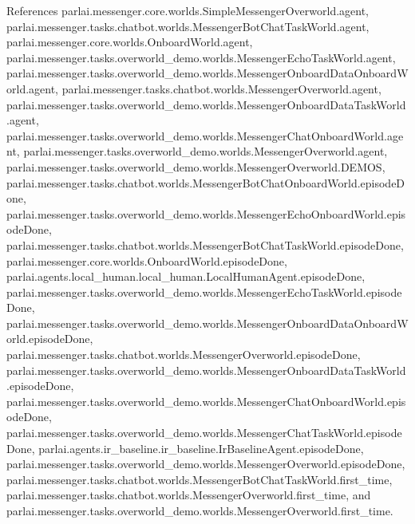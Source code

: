 References parlai.\+messenger.\+core.\+worlds.\+Simple\+Messenger\+Overworld.\+agent, parlai.\+messenger.\+tasks.\+chatbot.\+worlds.\+Messenger\+Bot\+Chat\+Task\+World.\+agent, parlai.\+messenger.\+core.\+worlds.\+Onboard\+World.\+agent, parlai.\+messenger.\+tasks.\+overworld\+\_\+demo.\+worlds.\+Messenger\+Echo\+Task\+World.\+agent, parlai.\+messenger.\+tasks.\+overworld\+\_\+demo.\+worlds.\+Messenger\+Onboard\+Data\+Onboard\+World.\+agent, parlai.\+messenger.\+tasks.\+chatbot.\+worlds.\+Messenger\+Overworld.\+agent, parlai.\+messenger.\+tasks.\+overworld\+\_\+demo.\+worlds.\+Messenger\+Onboard\+Data\+Task\+World.\+agent, parlai.\+messenger.\+tasks.\+overworld\+\_\+demo.\+worlds.\+Messenger\+Chat\+Onboard\+World.\+agent, parlai.\+messenger.\+tasks.\+overworld\+\_\+demo.\+worlds.\+Messenger\+Overworld.\+agent, parlai.\+messenger.\+tasks.\+overworld\+\_\+demo.\+worlds.\+Messenger\+Overworld.\+D\+E\+M\+OS, parlai.\+messenger.\+tasks.\+chatbot.\+worlds.\+Messenger\+Bot\+Chat\+Onboard\+World.\+episode\+Done, parlai.\+messenger.\+tasks.\+overworld\+\_\+demo.\+worlds.\+Messenger\+Echo\+Onboard\+World.\+episode\+Done, parlai.\+messenger.\+tasks.\+chatbot.\+worlds.\+Messenger\+Bot\+Chat\+Task\+World.\+episode\+Done, parlai.\+messenger.\+core.\+worlds.\+Onboard\+World.\+episode\+Done, parlai.\+agents.\+local\+\_\+human.\+local\+\_\+human.\+Local\+Human\+Agent.\+episode\+Done, parlai.\+messenger.\+tasks.\+overworld\+\_\+demo.\+worlds.\+Messenger\+Echo\+Task\+World.\+episode\+Done, parlai.\+messenger.\+tasks.\+overworld\+\_\+demo.\+worlds.\+Messenger\+Onboard\+Data\+Onboard\+World.\+episode\+Done, parlai.\+messenger.\+tasks.\+chatbot.\+worlds.\+Messenger\+Overworld.\+episode\+Done, parlai.\+messenger.\+tasks.\+overworld\+\_\+demo.\+worlds.\+Messenger\+Onboard\+Data\+Task\+World.\+episode\+Done, parlai.\+messenger.\+tasks.\+overworld\+\_\+demo.\+worlds.\+Messenger\+Chat\+Onboard\+World.\+episode\+Done, parlai.\+messenger.\+tasks.\+overworld\+\_\+demo.\+worlds.\+Messenger\+Chat\+Task\+World.\+episode\+Done, parlai.\+agents.\+ir\+\_\+baseline.\+ir\+\_\+baseline.\+Ir\+Baseline\+Agent.\+episode\+Done, parlai.\+messenger.\+tasks.\+overworld\+\_\+demo.\+worlds.\+Messenger\+Overworld.\+episode\+Done, parlai.\+messenger.\+tasks.\+chatbot.\+worlds.\+Messenger\+Bot\+Chat\+Task\+World.\+first\+\_\+time, parlai.\+messenger.\+tasks.\+chatbot.\+worlds.\+Messenger\+Overworld.\+first\+\_\+time, and parlai.\+messenger.\+tasks.\+overworld\+\_\+demo.\+worlds.\+Messenger\+Overworld.\+first\+\_\+time.

\mbox{\label{classparlai_1_1messenger_1_1tasks_1_1overworld__demo_1_1worlds_1_1MessengerOverworld_a8915db9b01cc1d923a9a45d7c10538de}} 
